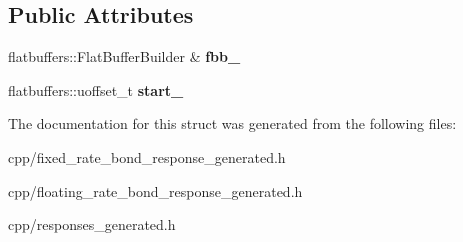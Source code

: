 \subsection*{Public Attributes}
\begin{DoxyCompactItemize}
\item 
\mbox{\label{structquantra_1_1FlowInterestBuilder_ae840d4f78c2001797e022d2cbe56265f}} 
flatbuffers\+::\+Flat\+Buffer\+Builder \& {\bfseries fbb\+\_\+}
\item 
\mbox{\label{structquantra_1_1FlowInterestBuilder_ae09dbcf1bb1685fa448a9b167aee3fe0}} 
flatbuffers\+::uoffset\+\_\+t {\bfseries start\+\_\+}
\end{DoxyCompactItemize}


The documentation for this struct was generated from the following files\+:\begin{DoxyCompactItemize}
\item 
cpp/fixed\+\_\+rate\+\_\+bond\+\_\+response\+\_\+generated.\+h\item 
cpp/floating\+\_\+rate\+\_\+bond\+\_\+response\+\_\+generated.\+h\item 
cpp/responses\+\_\+generated.\+h\end{DoxyCompactItemize}
